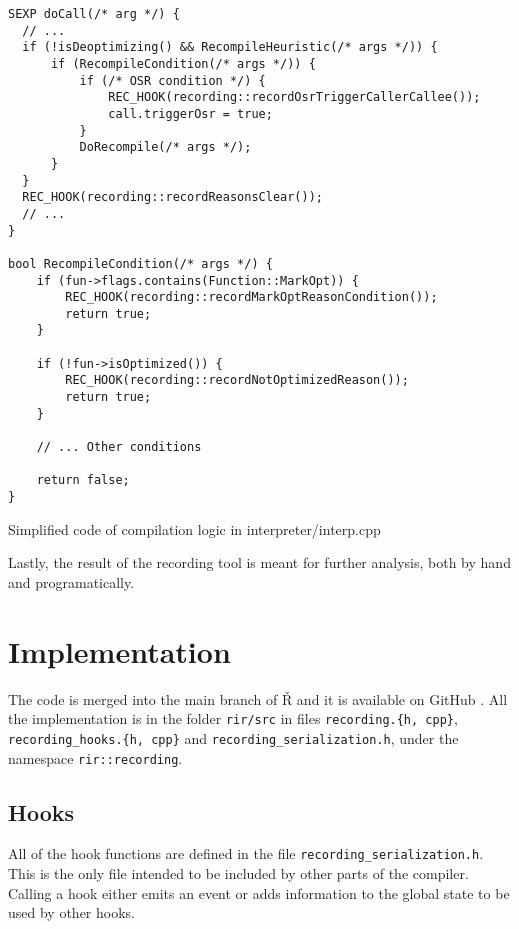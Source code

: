 \begin{listing}
	\centering
	\begin{verbatim}
SEXP doCall(/* arg */) {
  // ...
  if (!isDeoptimizing() && RecompileHeuristic(/* args */)) {
      if (RecompileCondition(/* args */)) {
          if (/* OSR condition */) {
              REC_HOOK(recording::recordOsrTriggerCallerCallee());
              call.triggerOsr = true;
          }
          DoRecompile(/* args */);
      }
  }
  REC_HOOK(recording::recordReasonsClear());
  // ...
}

bool RecompileCondition(/* args */) {
    if (fun->flags.contains(Function::MarkOpt)) {
        REC_HOOK(recording::recordMarkOptReasonCondition());
        return true;
    }

    if (!fun->isOptimized()) {
        REC_HOOK(recording::recordNotOptimizedReason());
        return true;
    }

    // ... Other conditions

    return false;
}
  \end{verbatim}
	\caption{Simplified code of compilation logic in interpreter/interp.cpp}\label{lst:hook-docall}
\end{listing}

Lastly, the result of the recording tool is meant for further analysis, both by hand and programatically. \todoadd


\section{Implementation}

The code is merged into the main branch of Ř and it is available on GitHub \todoadd. All the implementation is in the folder \texttt{rir/src} in files \texttt{recording.\{h, cpp\}}, \texttt{recording\_hooks.\{h, cpp\}} and \texttt{recording\_serialization.h}, under the namespace \texttt{rir::recording}.

\subsection{Hooks}

All of the hook functions are defined in the file \texttt{recording\_serialization.h}. This is the only file intended to be included by other parts of the compiler. Calling a hook either emits an event or adds information to the global state to be used by other hooks.


